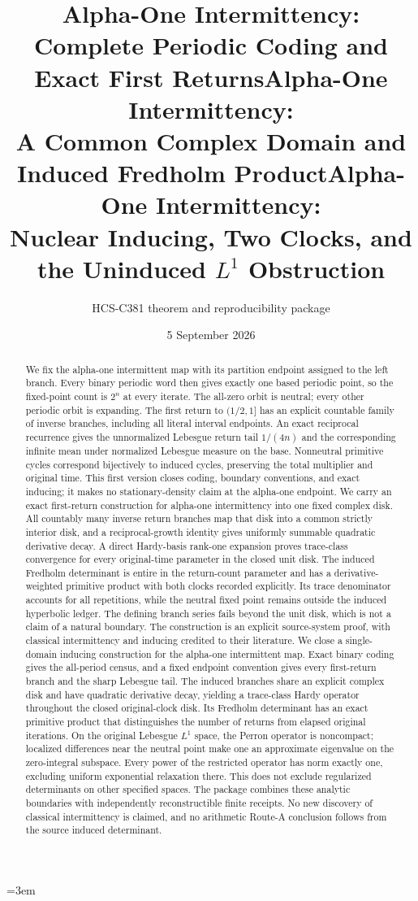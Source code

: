\documentclass[10pt]{article}
\title{Alpha-One Intermittency:\\Complete Periodic Coding and Exact First Returns}
\title{Alpha-One Intermittency:\\A Common Complex Domain and Induced Fredholm Product}
\title{Alpha-One Intermittency:\\Nuclear Inducing, Two Clocks, and the Uninduced $L^1$ Obstruction}
\author{HCS-C381 theorem and reproducibility package}
\date{5 September 2026}
\begin{document}
\emergencystretch=3em
\maketitle
\begin{abstract}
\ifcase\CRevisionRound
We fix the alpha-one intermittent map with its partition endpoint assigned
to the left branch. Every binary periodic word then gives exactly one based
periodic point, so the fixed-point count is $2^n$ at every iterate. The
all-zero orbit is neutral; every other periodic orbit is expanding. The
first return to $(1/2,1]$ has an explicit countable family of inverse branches,
including all literal interval endpoints. An exact reciprocal recurrence
gives the unnormalized Lebesgue return tail $1/(4n)$ and the corresponding
infinite mean under normalized Lebesgue measure on the base. Nonneutral
primitive cycles correspond bijectively to induced cycles, preserving the
total multiplier and original time. This first version closes coding,
boundary conventions, and exact inducing; it makes no stationary-density
claim at the alpha-one endpoint.
\or
We carry an exact first-return construction for alpha-one intermittency into
one fixed complex disk. All countably many inverse return branches map that
disk into a common strictly interior disk, and a reciprocal-growth identity
gives uniformly summable quadratic derivative decay. A direct Hardy-basis
rank-one expansion proves trace-class convergence for every original-time
parameter in the closed unit disk. The induced Fredholm determinant is entire
in the return-count parameter and has a derivative-weighted primitive product
with both clocks recorded explicitly. Its trace denominator accounts for all
repetitions, while the neutral fixed point remains outside the induced
hyperbolic ledger. The defining branch series fails beyond the unit disk,
which is not a claim of a natural boundary. The construction is an explicit
source-system proof, with classical intermittency and inducing credited to
their literature.
\else
We close a single-domain inducing construction for the alpha-one intermittent
map. Exact binary coding gives the all-period census, and a fixed endpoint
convention gives every first-return branch and the sharp Lebesgue tail.
The induced branches share an explicit complex disk and have quadratic
derivative decay, yielding a trace-class Hardy operator throughout the closed
original-clock disk. Its Fredholm determinant has an exact primitive product
that distinguishes the number of returns from elapsed original iterations.
On the original Lebesgue $L^1$ space, the Perron operator is noncompact;
localized differences near the neutral point make one an approximate
eigenvalue on the zero-integral subspace. Every power of the restricted
operator has norm exactly one, excluding uniform exponential relaxation
there. This does not exclude regularized determinants
on other specified spaces. The package combines these analytic boundaries
with independently reconstructible finite receipts. No new discovery of
classical intermittency is claimed, and no arithmetic Route-A conclusion
follows from the source induced determinant.
\fi
\end{abstract}
\end{document}
